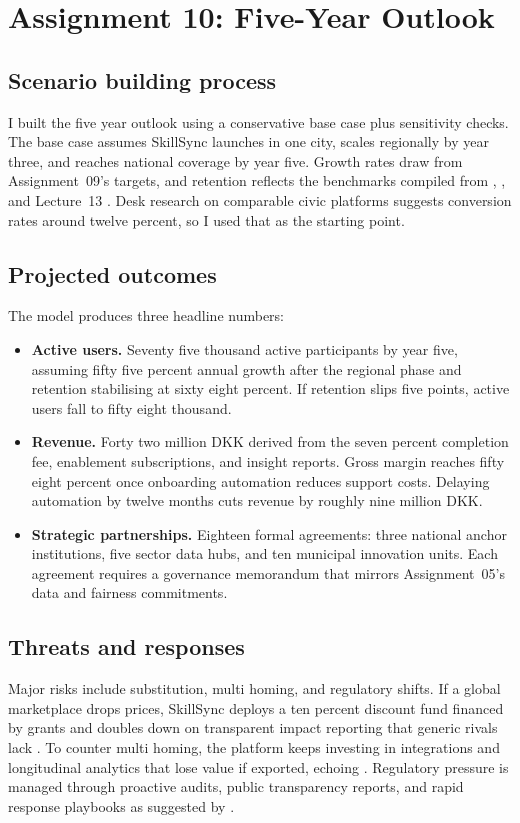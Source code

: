 \section*{Assignment 10: Five-Year Outlook}

\subsection*{Scenario building process}
I built the five year outlook using a conservative base case plus sensitivity checks. The base case assumes SkillSync launches in one city, scales regionally by year three, and reaches national coverage by year five. Growth rates draw from Assignment~09's targets, and retention reflects the benchmarks compiled from \citet{Choudary2016}, \citet{Srnicek2017}, and Lecture~13 \citep{Lecture13}. Desk research on comparable civic platforms suggests conversion rates around twelve percent, so I used that as the starting point.

\subsection*{Projected outcomes}
The model produces three headline numbers:
\begin{itemize}
  \item \textbf{Active users.} Seventy five thousand active participants by year five, assuming fifty five percent annual growth after the regional phase and retention stabilising at sixty eight percent. If retention slips five points, active users fall to fifty eight thousand.
  \item \textbf{Revenue.} Forty two million DKK derived from the seven percent completion fee, enablement subscriptions, and insight reports. Gross margin reaches fifty eight percent once onboarding automation reduces support costs. Delaying automation by twelve months cuts revenue by roughly nine million DKK.
  \item \textbf{Strategic partnerships.} Eighteen formal agreements: three national anchor institutions, five sector data hubs, and ten municipal innovation units. Each agreement requires a governance memorandum that mirrors Assignment~05's data and fairness commitments.
\end{itemize}

\subsection*{Threats and responses}
Major risks include substitution, multi homing, and regulatory shifts. If a global marketplace drops prices, SkillSync deploys a ten percent discount fund financed by grants and doubles down on transparent impact reporting that generic rivals lack \citep{Porter2008}. To counter multi homing, the platform keeps investing in integrations and longitudinal analytics that lose value if exported, echoing \citet{FarrellSaloner1986}. Regulatory pressure is managed through proactive audits, public transparency reports, and rapid response playbooks as suggested by \citet{Srnicek2017}.

